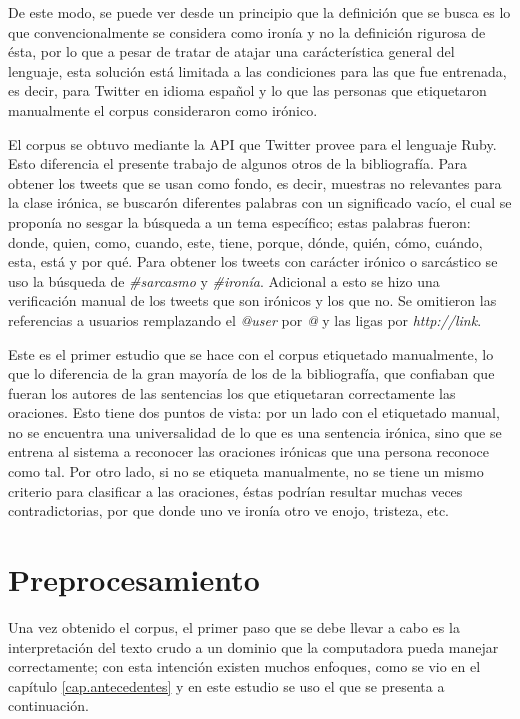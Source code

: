 \par De este modo, se puede ver desde un principio que la definición que se busca es lo que convencionalmente se considera como ironía y no la definición rigurosa de ésta, por lo que a pesar de tratar de atajar una carácterística general del lenguaje, esta solución está limitada a las condiciones para las que fue entrenada, es decir, para Twitter en idioma español y lo que las personas que etiquetaron manualmente el corpus consideraron como irónico.

\par El corpus se obtuvo mediante la API que Twitter provee para el lenguaje Ruby. Esto diferencia el presente trabajo de algunos otros de la bibliografía. Para obtener los tweets que se usan como fondo, es decir, muestras no relevantes para la clase irónica, se buscarón diferentes palabras con un significado vacío, el cual se proponía no sesgar la búsqueda a un tema específico; estas palabras fueron: donde, quien, como, cuando, este, tiene, porque, dónde, quién, cómo, cuándo, esta, está y por qué. Para obtener los tweets con carácter irónico o sarcástico se uso la búsqueda de \textit{ \#sarcasmo} y \textit{\#ironía}. Adicional a esto se hizo una verificación manual de los tweets que son irónicos y los que no. Se omitieron las referencias a usuarios remplazando el \textit{@user} por \textit{@} y las ligas por \textit{http://link}.

\par Este es el primer estudio que se hace con el corpus etiquetado manualmente, lo que lo diferencia de la gran mayoría de los de la bibliografía, que confiaban que fueran los autores de las sentencias los que etiquetaran correctamente las oraciones. Esto tiene dos puntos de vista: por un lado con el etiquetado manual, no se encuentra una universalidad de lo que es una sentencia irónica, sino que se entrena al sistema a reconocer las oraciones irónicas que una persona reconoce como tal. Por otro lado, si no se etiqueta manualmente, no se tiene un mismo criterio para clasificar a las oraciones, éstas podrían resultar muchas veces contradictorias, por que donde uno ve ironía otro ve enojo, tristeza, etc.

\section{Preprocesamiento}
\par Una vez obtenido el corpus, el primer paso que se debe llevar a cabo es la interpretación del texto crudo a un dominio que la computadora pueda manejar correctamente; con esta intención existen muchos enfoques, como se vio en el capítulo \ref{cap.antecedentes} y en este estudio se uso el que se presenta a continuación.
